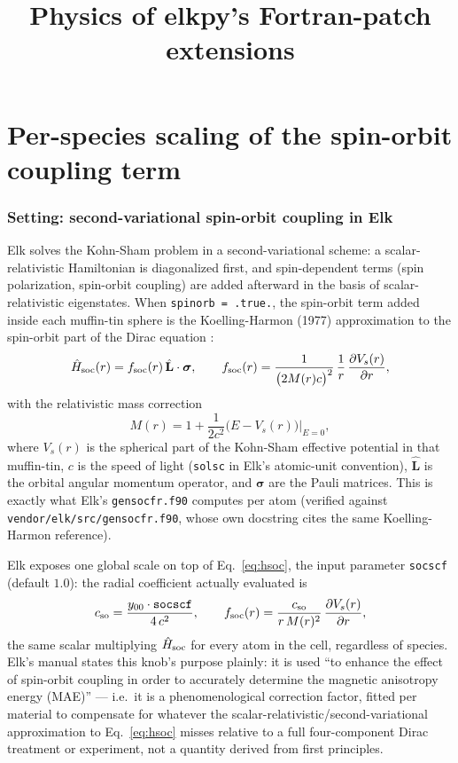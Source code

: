 \documentclass[11pt]{article}
\title{Physics of elkpy's Fortran-patch extensions}
\author{}
\date{}
\begin{document}
\maketitle

\tableofcontents

\part{Per-species scaling of the spin-orbit coupling term}
\label{part:soc}

\section{Setting: second-variational spin-orbit coupling in Elk}

Elk solves the Kohn-Sham problem in a second-variational scheme: a scalar-relativistic
Hamiltonian is diagonalized first, and spin-dependent terms (spin polarization,
spin-orbit coupling) are added afterward in the basis of scalar-relativistic
eigenstates. When \texttt{spinorb = .true.}, the spin-orbit term added inside each
muffin-tin sphere is the Koelling-Harmon (1977) approximation to the spin-orbit part of
the Dirac equation \cite{koelling1977}:
\begin{equation}
  \hat H_{\rm soc}(r) = f_{\rm soc}(r)\,\hat{\mathbf L}\cdot\boldsymbol\sigma,
  \qquad
  f_{\rm soc}(r) = \frac{1}{\bigl(2 M(r) c\bigr)^2}\,\frac{1}{r}\,
    \frac{\partial V_s(r)}{\partial r},
  \label{eq:hsoc}
\end{equation}
with the relativistic mass correction
\begin{equation}
  M(r) = 1 + \frac{1}{2c^2}\bigl(E - V_s(r)\bigr)\Big|_{E=0},
\end{equation}
where $V_s(r)$ is the spherical part of the Kohn-Sham effective potential in that
muffin-tin, $c$ is the speed of light (\texttt{solsc} in Elk's atomic-unit convention),
$\hat{\mathbf L}$ is the orbital angular momentum operator, and $\boldsymbol\sigma$ are
the Pauli matrices. This is exactly what Elk's \texttt{gensocfr.f90} computes per atom
(verified against \texttt{vendor/elk/src/gensocfr.f90}, whose own docstring cites the
same Koelling-Harmon reference).

Elk exposes one global scale on top of Eq.~\eqref{eq:hsoc}, the input parameter
\texttt{socscf} (default $1.0$): the radial coefficient actually evaluated is
\begin{equation}
  c_{\rm so} = \frac{y_{00}\cdot \texttt{socscf}}{4\,c^2},
  \qquad
  f_{\rm soc}(r) = \frac{c_{\rm so}}{r\,M(r)^2}\,\frac{\partial V_s(r)}{\partial r},
  \label{eq:socscf}
\end{equation}
the same scalar multiplying $\hat H_{\rm soc}$ for every atom in the cell, regardless
of species. Elk's manual states this knob's purpose plainly: it is used ``to enhance
the effect of spin-orbit coupling in order to accurately determine the magnetic
anisotropy energy (MAE)'' — i.e.\ it is a phenomenological correction factor, fitted
per material to compensate for whatever the scalar-relativistic/second-variational
approximation to Eq.~\eqref{eq:hsoc} misses relative to a full four-component Dirac
treatment or experiment, not a quantity derived from first principles.
\end{document}

